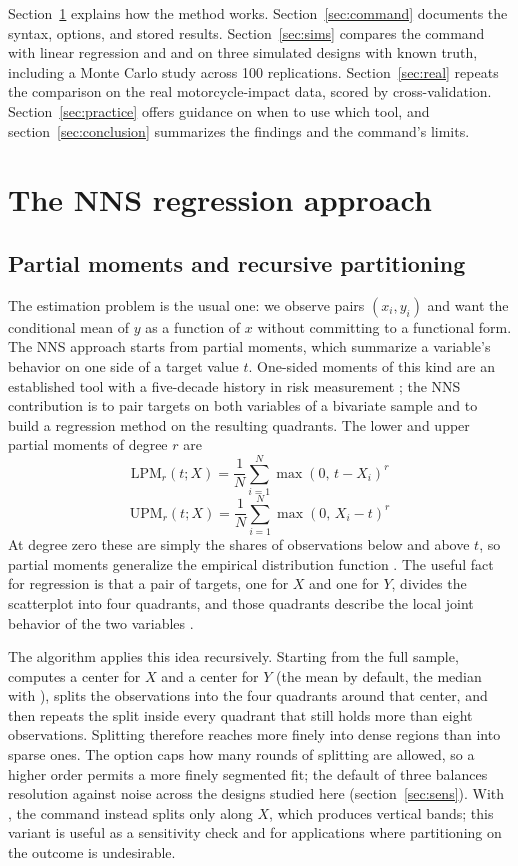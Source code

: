 Section~\ref{sec:method} explains how the method works.
Section~\ref{sec:command} documents the syntax, options, and stored results.
Section~\ref{sec:sims} compares the command with linear regression and
 and  on three simulated
designs with known truth, including a Monte Carlo study across 100
replications.  Section~\ref{sec:real} repeats the comparison on the real
motorcycle-impact data, scored by cross-validation.
Section~\ref{sec:practice} offers guidance on when to use which
tool, and section~\ref{sec:conclusion} summarizes the findings and the
command's limits.

\section{The NNS regression approach}
\label{sec:method}

\subsection{Partial moments and recursive partitioning}

The estimation problem is the usual one: we observe pairs $(x_i, y_i)$ and
want the conditional mean of $y$ as a function of $x$ without committing to a
functional form.  The NNS approach starts from partial moments, which
summarize a variable's behavior on one side of a target value $t$.  One-sided
moments of this kind are an established tool with a five-decade history in
risk measurement \citep{bawa_1975,fishburn_1977}; the NNS contribution is to
pair targets on both variables of a bivariate sample and to build a
regression method on the resulting quadrants.  The lower and upper partial moments of degree $r$ are
\[
  \mathrm{LPM}_r(t;X) = \frac{1}{N}\sum_{i=1}^{N} \max(0,\,t-X_i)^r
\]
\[
  \mathrm{UPM}_r(t;X) = \frac{1}{N}\sum_{i=1}^{N} \max(0,\,X_i-t)^r
\]
At degree zero these are simply the shares of observations below and above
$t$, so partial moments generalize the empirical distribution function
\citep{viole_nawrocki_2012_cdf}.  The useful fact for regression is that a
pair of targets, one for $X$ and one for $Y$, divides the scatterplot into
four quadrants, and those quadrants describe the local joint behavior of the
two variables \citep{viole_nawrocki_2012_corr}.

The algorithm applies this idea recursively.  Starting from the full sample,
 computes a center for $X$ and a center for $Y$ (the mean by
default, the median with ), splits the observations into
the four quadrants around that center, and then repeats the split inside
every quadrant that still holds more than eight observations.  Splitting
therefore reaches more finely into dense regions than into sparse ones.  The
 option caps how many rounds of splitting are allowed, so a
higher order permits a more finely segmented fit; the default of three
balances resolution against noise across the designs studied here
(section~\ref{sec:sens}).  With , the command instead
splits only along $X$, which produces vertical bands; this variant is useful
as a sensitivity check and for applications where partitioning on the outcome
is undesirable.

